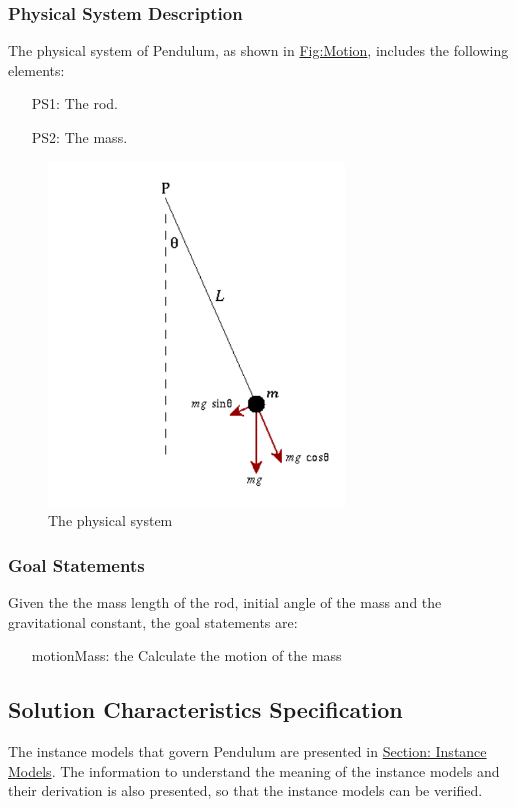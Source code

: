 \documentclass[12pt]{article}
\begin{document}
\subsubsection{Physical System Description}
\label{Sec:PhysSyst}
The physical system of Pendulum, as shown in \hyperref[Figure:Motion]{Fig:Motion}, includes the following elements:

\begin{itemize}
\item[PS1:]{The rod.}
\item[PS2:]{The mass.}
\end{itemize}
\begin{figure}
\begin{center}
\includegraphics[width=0.7\textwidth]{../../../datafiles/DblPendulum/pendulum.png}
\caption{The physical system}
\label{Figure:Motion}
\end{center}
\end{figure}
\subsubsection{Goal Statements}
\label{Sec:GoalStmt}
Given the the mass length of the rod, initial angle of the mass and the gravitational constant, the goal statements are:

\begin{itemize}
\item[motionMass:\phantomsection\label{motionMass}]{the Calculate the motion of the mass}
\end{itemize}
\subsection{Solution Characteristics Specification}
\label{Sec:SolCharSpec}
The instance models that govern Pendulum are presented in \hyperref[Sec:IMs]{Section: Instance Models}. The information to understand the meaning of the instance models and their derivation is also presented, so that the instance models can be verified.
\end{document}
